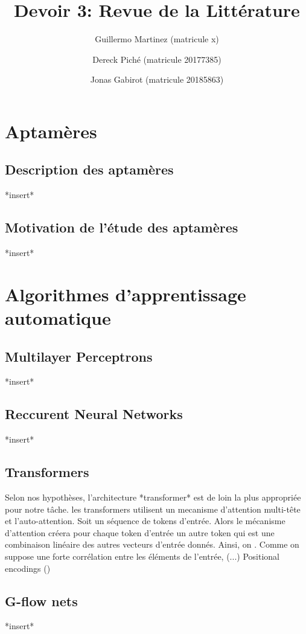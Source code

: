 \documentclass{article}
\title{Devoir 3: Revue de la Littérature}
\author
{
    Guillermo Martinez (matricule x)
    \and
    Dereck Piché (matricule 20177385)
    \and
    Jonas Gabirot (matricule 20185863)
}
\begin{document}
\maketitle

\section*{Aptamères}
\subsection*{Description des aptamères}
*insert*
\subsection*{Motivation de l'étude des aptamères}
*insert*

\section*{Algorithmes d'apprentissage automatique}
\subsection*{Multilayer Perceptrons}
*insert*
\subsection*{Reccurent Neural Networks}
*insert*
\subsection*{Transformers}
Selon nos hypothèses, l'architecture *transformer*  est de loin
la plus appropriée pour notre tâche. les transformers utilisent 
un mecanisme d'attention multi-tête et l'auto-attention. Soit
un séquence de tokens d'entrée. Alors le mécanisme d'attention 
créera pour chaque token d'entrée un autre token qui est une 
combinaison linéaire des autres vecteurs d'entrée donnés. Ainsi, 
on \cite{transPaper}. Comme on suppose une forte corrélation 
entre les éléments de l'entrée, (...) Positional encodings ()
\subsection*{G-flow nets}
*insert*
\end{document}
